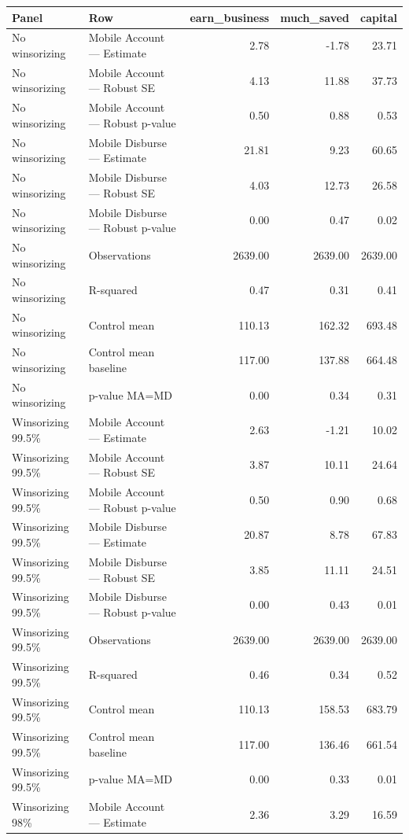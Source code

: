 
\begin{tabular}{llrrr}
\toprule
Panel & Row & earn\_business & much\_saved & capital\\
\midrule
No winsorizing & Mobile Account — Estimate & 2.78 & -1.78 & 23.71\\
No winsorizing & Mobile Account — Robust SE & 4.13 & 11.88 & 37.73\\
No winsorizing & Mobile Account — Robust p-value & 0.50 & 0.88 & 0.53\\
No winsorizing & Mobile Disburse — Estimate & 21.81 & 9.23 & 60.65\\
No winsorizing & Mobile Disburse — Robust SE & 4.03 & 12.73 & 26.58\\
\addlinespace
No winsorizing & Mobile Disburse — Robust p-value & 0.00 & 0.47 & 0.02\\
No winsorizing & Observations & 2639.00 & 2639.00 & 2639.00\\
No winsorizing & R-squared & 0.47 & 0.31 & 0.41\\
No winsorizing & Control mean & 110.13 & 162.32 & 693.48\\
No winsorizing & Control mean baseline & 117.00 & 137.88 & 664.48\\
\addlinespace
No winsorizing & p-value MA=MD & 0.00 & 0.34 & 0.31\\
Winsorizing 99.5\% & Mobile Account — Estimate & 2.63 & -1.21 & 10.02\\
Winsorizing 99.5\% & Mobile Account — Robust SE & 3.87 & 10.11 & 24.64\\
Winsorizing 99.5\% & Mobile Account — Robust p-value & 0.50 & 0.90 & 0.68\\
Winsorizing 99.5\% & Mobile Disburse — Estimate & 20.87 & 8.78 & 67.83\\
\addlinespace
Winsorizing 99.5\% & Mobile Disburse — Robust SE & 3.85 & 11.11 & 24.51\\
Winsorizing 99.5\% & Mobile Disburse — Robust p-value & 0.00 & 0.43 & 0.01\\
Winsorizing 99.5\% & Observations & 2639.00 & 2639.00 & 2639.00\\
Winsorizing 99.5\% & R-squared & 0.46 & 0.34 & 0.52\\
Winsorizing 99.5\% & Control mean & 110.13 & 158.53 & 683.79\\
\addlinespace
Winsorizing 99.5\% & Control mean baseline & 117.00 & 136.46 & 661.54\\
Winsorizing 99.5\% & p-value MA=MD & 0.00 & 0.33 & 0.01\\
Winsorizing 98\% & Mobile Account — Estimate & 2.36 & 3.29 & 16.59\\

\end{tabular}
